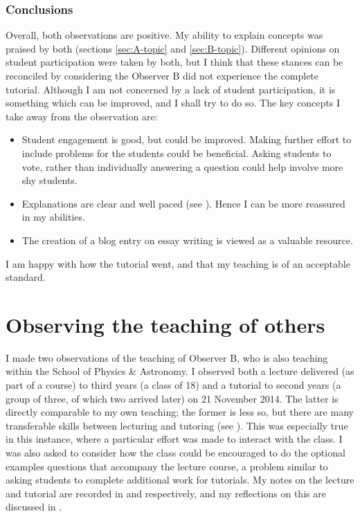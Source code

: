 \subsubsection{Conclusions}\label{sec:me-conclusions}

Overall, both observations are positive. My ability to explain concepts was praised by both (sections \ref{sec:A-topic} and \ref{sec:B-topic}). Different opinions on student participation were taken by both, but I think that these stances can be reconciled by considering the Observer B did not experience the complete tutorial. Although I am not concerned by a lack of student participation, it is something which can be improved, and I shall try to do so. The key concepts I take away from the observation are:
\begin{itemize}
\item Student engagement is good, but could be improved. Making further effort to include problems for the students could be beneficial. Asking students to vote, rather than individually answering a question could help involve more shy students.
\item Explanations are clear and well paced (see ). Hence I can be more reassured in my abilities.
\item The creation of a blog entry on essay writing is viewed as a valuable resource.
\end{itemize}
I am happy with how the tutorial went, and that my teaching is of an acceptable standard.

\section{Observing the teaching of others}\label{sec:other}

I made two observations of the teaching of Observer B, who is also teaching within the School of Physics \& Astronomy. I observed both a lecture delivered (as part of a course) to third years (a class of 18) and a tutorial to second years (a group of three, of which two arrived later) on 21 November 2014. The latter is directly comparable to my own teaching; the former is less so, but there are many transferable skills between lecturing and tutoring (see ). This was especially true in this instance, where a particular effort was made to interact with the class. I was also asked to consider how the class could be encouraged to do the optional examples questions that accompany the lecture course, a problem similar to asking students to complete additional work for tutorials. My notes on the lecture and tutorial are recorded in  and  respectively, and my reflections on this are discussed in .

